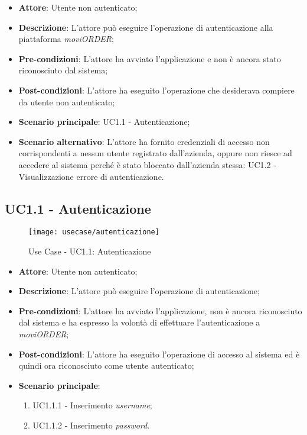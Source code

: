 \begin{itemize}
	\item \textbf{Attore}: Utente non autenticato;
	\item \textbf{Descrizione}: L'attore può eseguire l'operazione di autenticazione alla piattaforma \textit{moviORDER};
	\item \textbf{Pre-condizioni}: L'attore ha avviato l'applicazione e non è ancora stato riconosciuto dal sistema;
	\item \textbf{Post-condizioni}: L'attore ha eseguito l'operazione che desiderava compiere da utente non autenticato;
	\item \textbf{Scenario principale}: UC1.1 - Autenticazione;
	\item \textbf{Scenario alternativo}: L'attore ha fornito credenziali di accesso non corrispondenti a nessun utente registrato dall'azienda, oppure non riesce ad accedere al sistema perché è stato bloccato dall'azienda stessa: UC1.2 - Visualizzazione errore di autenticazione. 
\end{itemize}

\subsection{UC1.1 - Autenticazione}

\begin{figure}[!h] 
    \centering 
    \texttt{[image: usecase/autenticazione]} 
    \caption{Use Case - UC1.1: Autenticazione}
\end{figure}

\begin{itemize}
	\item \textbf{Attore}: Utente non autenticato;
	\item \textbf{Descrizione}: L'attore può eseguire l'operazione di autenticazione;
	\item \textbf{Pre-condizioni}: L'attore ha avviato l'applicazione, non è ancora riconosciuto dal sistema e ha espresso la volontà di effettuare l'autenticazione a \textit{moviORDER};
	\item \textbf{Post-condizioni}: L'attore ha eseguito l'operazione di accesso al sistema ed è quindi ora riconosciuto come utente autenticato;
	\item \textbf{Scenario principale}: 
		\begin{enumerate}
			\item UC1.1.1 - Inserimento \textit{username};
			\item UC1.1.2 - Inserimento \textit{password}.
		\end{enumerate} 
\end{itemize}


